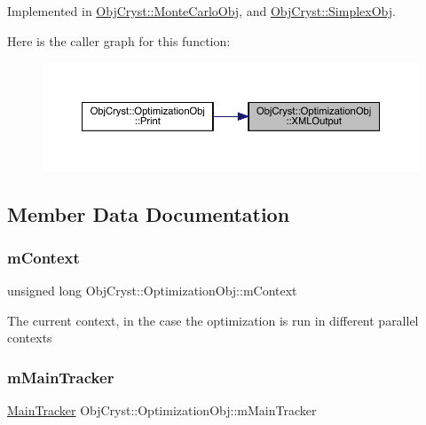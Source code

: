 Implemented in \mbox{\hyperlink{class_obj_cryst_1_1_monte_carlo_obj_a540de9354fcb298fca0458f041238f6e}{Obj\+Cryst\+::\+Monte\+Carlo\+Obj}}, and \mbox{\hyperlink{class_obj_cryst_1_1_simplex_obj_a6437ce6f4077afb198e26069c4cb224e}{Obj\+Cryst\+::\+Simplex\+Obj}}.

Here is the caller graph for this function\+:
\nopagebreak
\begin{figure}[H]
\begin{center}
\leavevmode
\includegraphics[width=350pt]{class_obj_cryst_1_1_optimization_obj_a6b7726159bb0d5dad1c7eebaee78f53a_icgraph}
\end{center}
\end{figure}


\subsection{Member Data Documentation}
\mbox{\label{class_obj_cryst_1_1_optimization_obj_a7139f75c5b214ea00f99c2e4c25b2b34}} 
\subsubsection{\texorpdfstring{mContext}{mContext}}
{\footnotesize\ttfamily unsigned long Obj\+Cryst\+::\+Optimization\+Obj\+::m\+Context\hspace{0.3cm}{\ttfamily [protected]}}

The current \textquotesingle{}context\textquotesingle{}, in the case the optimization is run in different parallel contexts \mbox{\label{class_obj_cryst_1_1_optimization_obj_abe2f9a9812abe0f4a6c414457b5b2967}} 
\subsubsection{\texorpdfstring{mMainTracker}{mMainTracker}}
{\footnotesize\ttfamily \mbox{\hyperlink{class_obj_cryst_1_1_main_tracker}{Main\+Tracker}} Obj\+Cryst\+::\+Optimization\+Obj\+::m\+Main\+Tracker\hspace{0.3cm}{\ttfamily [protected]}}

